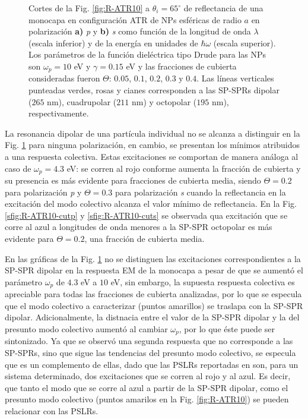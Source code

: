 \begin{figure}[h!]
	\caption{Cortes de la Fig. \ref{fig:R-ATR10} a $\theta_i = 65^\circ$ de reflectancia de una monocapa en configuración ATR de NPs esféricas de radio $a$ en polarización \textbf{a)} \emph{p} y \textbf{b)} \emph{s} como función de la longitud de onda $\lambda$ (escala inferior) y de la energía en unidades de $\hbar \omega$ (escala superior). Los parámetros de la función dieléctrica tipo Drude para las NPs son $\omega_p = 10$ eV y $\gamma = 0.15$ eV y las fracciones de cubierta consideradas fueron $\Theta$: $0. 05$, $0. 1$, $0. 2$, $0. 3$ y $0. 4$. Las líneas verticales punteadas verdes, rosas y cianes corresponden a las SP-SPRs dipolar ($265$ nm), cuadrupolar ($211$ nm) y octopolar ($195$ nm), respectivamente.  }\label{fig:R-ATR10-Cuts}
	\end{figure}	

La resonancia dipolar de una partícula individual no se alcanza a distinguir en la Fig. \ref{fig:R-ATR10-Cuts} para ninguna polarización, en cambio, se presentan los mínimos atribuidos a una respuesta colectiva. Estas excitaciones se comportan de manera análoga al caso de $\omega_p = 4.3$ eV: se corren al rojo conforme aumenta la fracción de cubierta y su presencia es más evidente para fracciones de cubierta media, siendo  $\Theta=0.2$ para polarización \emph{p} y $\Theta=0.3$ para polarización \emph{s} cuando la reflectancia en la excitación del modo colectivo alcanza el valor mínimo de reflectancia. En la Fig. \ref{sfig:R-ATR10-cutp} y \ref{sfig:R-ATR10-cuts}  se observada qua excitación que se corre al azul a longitudes de onda menores a la SP-SPR octopolar es más evidente para $\Theta=0.2$, una fracción de cubierta media.

En las gráficas de la Fig. \ref{fig:R-ATR10-Cuts} no se distinguen las excitaciones correspondientes a la SP-SPR dipolar en la respuesta EM de la monocapa a pesar de que se aumentó el parámetro $\omega_p$ de $4.3$ eV a $10$ eV, sin embargo, la supuesta respuesta colectiva es apreciable para todas las fracciones de cubierta analizadas, por lo que se especula que el modo colectivo a caracterizar (puntos amarillos) se traslapa con la SP-SPR  dipolar. Adicionalmente, la distnacia entre el valor de la SP-SPR dipolar y la del presunto modo colectivo aumentó al cambiar $\omega_p$, por lo que éste puede ser sintonizado. Ya que se observó una segunda respuesta que no corresponde a las SP-SPRs, sino que sigue las tendencias del presunto modo colectivo, se especula que es un complemento  de ellas, dado que las  PSLRs reportadas en \cite{danilov2018ultra} son, para un sistema determinado, dos excitaciones que se corren al rojo y al azul. Es decir, que tanto el modo que se corre al azul a partir de la SP-SPR dipolar, como el presunto modo colectivo (puntos amarilos en la Fig. \ref{fig:R-ATR10}) se pueden relacionar con las PSLRs.  

